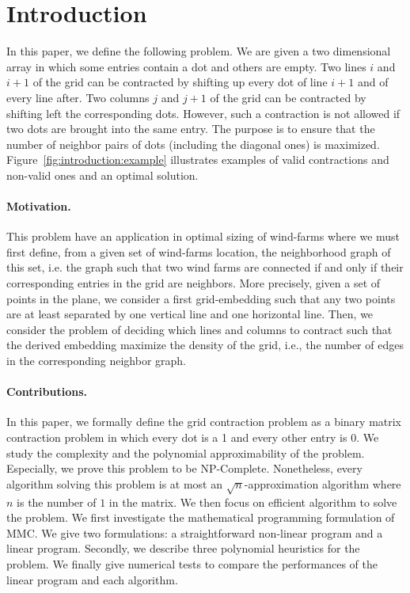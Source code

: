 \section{Introduction}
\label{sect:intro}


In this paper, we define the following problem. We are given a two dimensional array in which some entries contain a dot and others are empty. Two lines $i$ and $i+1$ of the grid can be contracted by shifting up every dot of line $i+1$ and of every line after. Two columns $j$ and $j+1$ of the grid can be contracted by shifting left the corresponding dots. However, such a contraction is not allowed if two dots are brought into the same entry. The purpose is to ensure that the number of neighbor pairs of dots (including the diagonal ones) is maximized. Figure~\ref{fig:introduction:example} illustrates examples of valid contractions and non-valid ones and an optimal solution.




\paragraph{Motivation. }
This problem have an application in optimal sizing of wind-farms \cite{Pillai2015} where we must first define, from a given set of wind-farms location, the neighborhood graph of this set, i.e. the graph such that two wind farms are connected if and only if their corresponding entries in the grid are neighbors. More precisely, given a set of points in the plane, we consider a first grid-embedding such that any two points are at least separated by one vertical line and one horizontal line. Then, we consider the problem of deciding which lines and columns to contract such that the derived embedding maximize the density of the grid, i.e., the number of edges in the corresponding neighbor graph.
\vspace{-0.2cm}
\paragraph{Contributions. } In this paper, we formally define the grid contraction problem as a binary matrix contraction problem in which every dot is a 1 and every other entry is 0. We study the complexity and the polynomial approximability of the problem. Especially, we prove this problem to be NP-Complete. Nonetheless, every algorithm solving this problem is at most an $\sqrt{n}$-approximation algorithm where $n$ is the number of $1$ in the matrix. We then focus on efficient algorithm to solve the problem. We first investigate the mathematical programming formulation of MMC. We give two formulations: a straightforward non-linear program and a linear program.
Secondly, we describe three polynomial heuristics for the problem. We finally give numerical tests to compare the performances of the linear program and each algorithm. 

